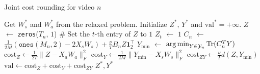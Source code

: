 \begin{algorithm}[t!]
	\caption{Joint cost rounding for video $n$}
	\label{jcrAlgo}
	\begin{algorithmic}
		\State Get  $W_s^*$ and $W_a^*$ from the relaxed problem.
		\State Initialize $Z^*$, $Y^*$ and $\text{val}^*=+\infty$.
			\State $Z$ $\gets$ \texttt{zeros}($T_n$, $1$) {\color{comment} \footnotesize \# Set the $t$-th entry of $Z$ to $1$}
			\State $Z_t$ $\gets$ $1$ 			
			\State $C_n$ $\gets$ $\frac{1}{2M}\left(\texttt{ones}(M_n, 2)-2X_sW_s\right)+\frac{\nu}{T} B_n Z \mathbf{1}_2^\top$ 
			\State $Y_{\min}$ $\gets$ $\operatorname*{arg\,min}_{Y \in \mathcal{Y}_n} \text{Tr}(C_n^TY)$ 
			\State $\text{cost}_Z \gets \frac{1}{2T} \|Z - X_{a} W_{a}\|_F^2$
			\State $\text{cost}_Y \gets \frac{1}{2M} \|Y_{\min} - X_{s} W_{s}\|_F^2$
			\State $\text{cost}_{ZY} \gets \frac{\nu}{T}d(Z,Y_{\min})$
			\State $\text{val} \gets \text{cost}_Z + \text{cost}_Y + \text{cost}_{ZY}$
			\EndIf
		\EndFor
		\State\Return $Z^*,Y^*$
	\end{algorithmic}
\end{algorithm}

